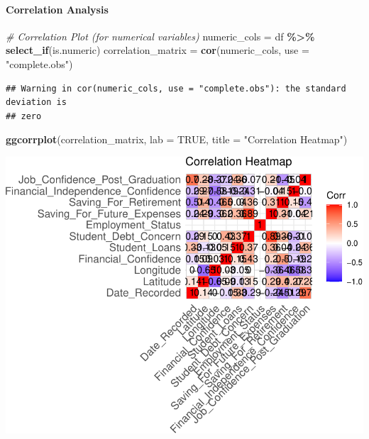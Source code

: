 \documentclass[
]{article}
\newenvironment{Shaded}{\begin{snugshade}}{\end{snugshade}}
\newcommand{\AttributeTok}[1]{\textcolor[rgb]{0.13,0.29,0.53}{#1}}
\newcommand{\CommentTok}[1]{\textcolor[rgb]{0.56,0.35,0.01}{\textit{#1}}}
\newcommand{\ConstantTok}[1]{\textcolor[rgb]{0.56,0.35,0.01}{#1}}
\newcommand{\FunctionTok}[1]{\textcolor[rgb]{0.13,0.29,0.53}{\textbf{#1}}}
\newcommand{\NormalTok}[1]{#1}
\newcommand{\OtherTok}[1]{\textcolor[rgb]{0.56,0.35,0.01}{#1}}
\newcommand{\SpecialCharTok}[1]{\textcolor[rgb]{0.81,0.36,0.00}{\textbf{#1}}}
\newcommand{\StringTok}[1]{\textcolor[rgb]{0.31,0.60,0.02}{#1}}
\begin{document}
\paragraph{Correlation Analysis}\label{correlation-analysis}

\begin{Shaded}
\begin{Highlighting}[]
\CommentTok{\# Correlation Plot (for numerical variables)}
\NormalTok{numeric\_cols }\OtherTok{=}\NormalTok{ df }\SpecialCharTok{\%\textgreater{}\%} \FunctionTok{select\_if}\NormalTok{(is.numeric)}
\NormalTok{correlation\_matrix }\OtherTok{=} \FunctionTok{cor}\NormalTok{(numeric\_cols, }\AttributeTok{use =} \StringTok{"complete.obs"}\NormalTok{)}
\end{Highlighting}
\end{Shaded}

\begin{verbatim}
## Warning in cor(numeric_cols, use = "complete.obs"): the standard deviation is
## zero
\end{verbatim}

\begin{Shaded}
\begin{Highlighting}[]
\FunctionTok{ggcorrplot}\NormalTok{(correlation\_matrix, }\AttributeTok{lab =} \ConstantTok{TRUE}\NormalTok{, }\AttributeTok{title =} \StringTok{"Correlation Heatmap"}\NormalTok{)}
\end{Highlighting}
\end{Shaded}

\includegraphics{Project1_files/figure-latex/unnamed-chunk-8-1.pdf}
\end{document}
